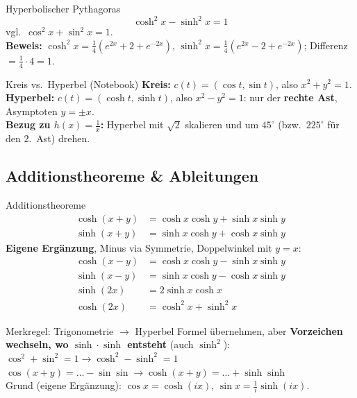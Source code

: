 \documentclass[a4paper, fontsize=7pt]{scrartcl}
\begin{document}
\begin{mainbox}{Hyperbolischer Pythagoras}
$$\boxed{\cosh^2 x - \sinh^2 x = 1}$$
vgl.\ $\cos^2 x + \sin^2 x = 1$.\\
\textbf{Beweis:} $\cosh^2 x = \tfrac{1}{4}\left(e^{2x} + 2 + e^{-2x}\right)$,
$\sinh^2 x = \tfrac{1}{4}\left(e^{2x} - 2 + e^{-2x}\right)$; Differenz
$= \tfrac{1}{4} \cdot 4 = 1$.
\end{mainbox}

\begin{subbox}{Kreis vs.\ Hyperbel (Notebook)}
\textbf{Kreis:} $c(t) = (\cos t, \sin t)$, also $x^2 + y^2 = 1$.\\
\textbf{Hyperbel:} $c(t) = (\cosh t, \sinh t)$, also $x^2 - y^2 = 1$: nur der
\textbf{rechte Ast}, Asymptoten $y = \pm x$.\\
\textbf{Bezug zu $h(x) = \frac{1}{x}$:} Hyperbel mit $\sqrt{2}$ skalieren und um
$45^\circ$ (bzw.\ $225^\circ$ für den 2.\ Ast) drehen.
\end{subbox}

\subsection{Additionstheoreme \& Ableitungen}

\begin{mainbox}{Additionstheoreme}
\begin{align*}
\cosh(x + y) &= \cosh x \cosh y + \sinh x \sinh y\\
\sinh(x + y) &= \sinh x \cosh y + \cosh x \sinh y
\end{align*}
\textbf{Eigene Ergänzung}, Minus via Symmetrie, Doppelwinkel mit $y = x$:
\begin{align*}
\cosh(x - y) &= \cosh x \cosh y - \sinh x \sinh y\\
\sinh(x - y) &= \sinh x \cosh y - \cosh x \sinh y\\
\sinh(2x) &= 2 \sinh x \cosh x\\
\cosh(2x) &= \cosh^2 x + \sinh^2 x
\end{align*}
\end{mainbox}

\begin{subbox}{Merkregel: Trigonometrie $\to$ Hyperbel}
Formel übernehmen, aber \textbf{Vorzeichen wechseln, wo $\sinh \cdot \sinh$
entsteht} (auch $\sinh^2$):\\
$\cos^2 + \sin^2 = 1 \to \cosh^2 - \sinh^2 = 1$\\
$\cos(x + y) = \ldots - \sin\sin \to \cosh(x + y) = \ldots + \sinh\sinh$\\
Grund (eigene Ergänzung): $\cos x = \cosh(ix)$, $\sin x = \frac{1}{i}\sinh(ix)$.
\end{subbox}
\end{document}
